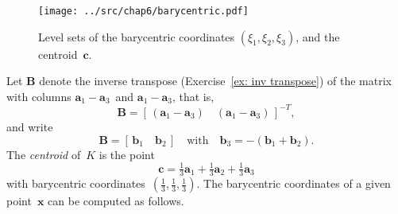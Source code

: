 \begin{figure}
\caption{Level sets of the barycentric coordinates 
$(\xi_1,\xi_2,\xi_3)$, and the centroid~$\boldsymbol{c}$.}
\label{fig: barycentric}
\begin{center}
\texttt{[image: ../src/chap6/barycentric.pdf]}
\end{center}
\end{figure}

Let $\boldsymbol{B}$ denote the inverse transpose 
(Exercise~\ref{ex: inv transpose}) of the matrix with columns 
$\boldsymbol{a}_1-\boldsymbol{a}_3$~and $\boldsymbol{a}_1-\boldsymbol{a}_3$, 
that is,
\[
\boldsymbol{B}=[\,(\boldsymbol{a}_1-\boldsymbol{a}_3)\quad
    (\boldsymbol{a}_1-\boldsymbol{a}_3)\,]^{-T},
\]
and write
\begin{equation}\label{eq: bp vector def}
\boldsymbol{B}=[\,\boldsymbol{b}_1\quad\boldsymbol{b}_2\,]
\quad\text{with}\quad\boldsymbol{b}_3=-(\boldsymbol{b}_1+\boldsymbol{b}_2).
\end{equation}
The \emph{centroid} of~$K$ is the point
\[
\boldsymbol{c}=\tfrac13\boldsymbol{a}_1+\tfrac13\boldsymbol{a}_2
+\tfrac13\boldsymbol{a}_3
\]
with barycentric coordinates~$(\tfrac13,\tfrac13,\tfrac13)$. The barycentric 
coordinates of a given point~$\boldsymbol{x}$ can be computed as follows.

